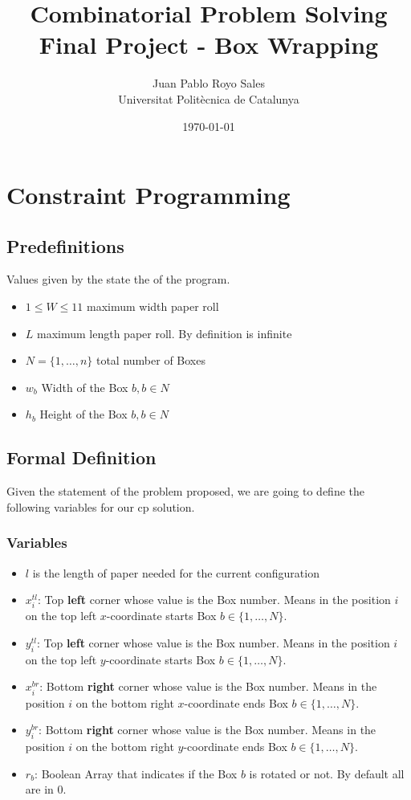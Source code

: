 \documentclass[12pt, a4paper]{article}
\title{%
      Combinatorial Problem Solving \\
      Final Project - Box Wrapping
}
\author{%
  Juan Pablo Royo Sales \\
  \small{Universitat Politècnica de Catalunya}
}
\date\today
\begin{document}
\maketitle

\section{Constraint Programming}

\subsection{Predefinitions}
Values given by the state the of the program.

\begin{itemize}
  \item $1 \leq W \leq 11$ maximum width paper roll
  \item $L$ maximum length paper roll. By definition is infinite
  \item $N = \{1, \dots, n\}$ total number of Boxes
  \item $w_b$ Width of the Box $b, b \in N$
  \item $h_b$ Height of the Box $b, b \in N$
\end{itemize}

\subsection{Formal Definition}
Given the statement of the problem proposed, we are going to define the following variables for our \acrfull{cp} solution.

\subsubsection{Variables}
\begin{itemize}
  \item $l$ is the length of paper needed for the current configuration
  \item $x_i^{tl}$: Top \textbf{left} corner whose value is the Box number. Means in the position $i$ on the top left $x$-coordinate starts Box $b \in \{1,\dots,N\}$.
  \item $y_i^{tl}$: Top \textbf{left} corner whose value is the Box number. Means in the position $i$ on the top left $y$-coordinate starts Box $b \in \{1,\dots,N\}$.
  \item $x_i^{br}$: Bottom \textbf{right} corner whose value is the Box number. Means in the position $i$ on the bottom right $x$-coordinate ends Box $b \in \{1,\dots,N\}$.
  \item $y_i^{br}$: Bottom \textbf{right} corner whose value is the Box number. Means in the position $i$ on the bottom right $y$-coordinate ends Box $b \in \{1,\dots,N\}$.
  \item $r_b$: Boolean Array that indicates if the Box $b$ is rotated or not. By default all are in $0$.
\end{itemize}
\end{document}

